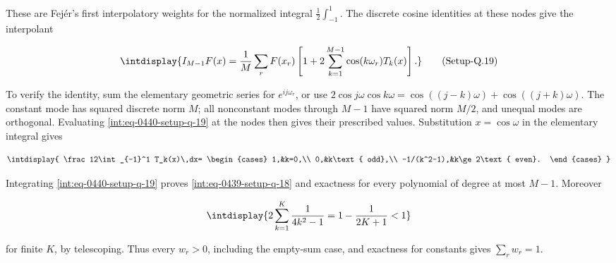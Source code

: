 These are Fejér's first interpolatory weights for the normalized integral \(\frac12\int_{-1}^1\). The discrete cosine identities at these nodes give the interpolant


\label{int:eq-setup-q-19}
\begingroup\renewcommand{\theHequation}{intdisplay.888}
\begin{equation}
\intdisplay{
I_{M-1}F(x)=
\frac1M\sum_r F(x_r)
\left[1+2\sum_{k=1}^{M-1}\cos(k\omega_r)T_k(x)\right].
}
\tag{Setup-Q.19}
\label{int:eq-0440-setup-q-19}
\end{equation}
\endgroup


To verify the identity, sum the elementary geometric series for \(e^{ij\omega_r}\), or use \(2\cos j\omega\cos k\omega=\cos((j-k)\omega)+ \cos((j+k)\omega)\). The constant mode has squared discrete norm \(M\); all nonconstant modes through \(M-1\) have squared norm \(M/2\), and unequal modes are orthogonal. Evaluating \hyperref[int:eq-setup-q-19]{\eqref{int:eq-0440-setup-q-19}} at the nodes then gives their prescribed values. Substitution \(x=\cos\omega\) in the elementary integral gives


\begingroup\renewcommand{\theHequation}{intdisplay.889}
\begin{equation*}
\intdisplay{
\frac12\int_{-1}^1 T_k(x)\,dx=
\begin{cases}
1,&k=0,\\
0,&k\text{ odd},\\
-1/(k^2-1),&k\ge2\text{ even}.
\end{cases}
}
\end{equation*}
\endgroup


Integrating \hyperref[int:eq-setup-q-19]{\eqref{int:eq-0440-setup-q-19}} proves \hyperref[int:eq-setup-q-18]{\eqref{int:eq-0439-setup-q-18}} and exactness for every polynomial of degree at most \(M-1\). Moreover


\begingroup\renewcommand{\theHequation}{intdisplay.890}
\begin{equation*}
\intdisplay{
2\sum_{k=1}^K\frac1{4k^2-1}=1-\frac1{2K+1}<1
}
\end{equation*}
\endgroup


for finite \(K\), by telescoping. Thus every \(w_r>0\), including the empty-sum case, and exactness for constants gives \(\sum_rw_r=1\).


